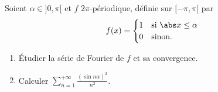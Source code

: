 \begin{enonce}
\begin{exercise}[ID={RMS 122-2 E1337 Mines Alès PC},subtitle={},tags={}, difficulty={0}]
  Soient $\alpha\in]0,\pi[$ et $f$ $2\pi$-périodique, définie sur $[-\pi,\pi[$ par
  \begin{equation*}
    f(x)=
    \begin{cases}
      1&\text{si } \abs x\leq \alpha\\
      0&\text{sinon.}
    \end{cases}
  \end{equation*}
  \begin{enumerate}
    \item Étudier la série de Fourier de $f$ et sa convergence.
    \item Calculer $\displaystyle\sum_{n=1}^{+\infty} \frac{(\sin n\alpha)^2}{n^2}$.
  \end{enumerate}
\end{exercise}
\begin{solution}
\end{solution}
\end{enonce}
